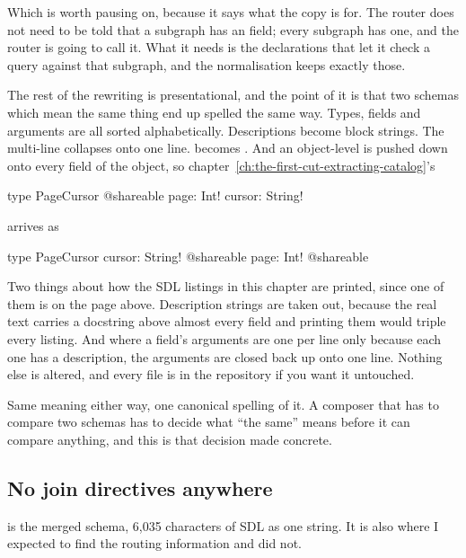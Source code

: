 %
Which is worth pausing on, because it says what the copy is for. The router does
not need to be told that a subgraph has an  field; every
subgraph has one, and the router is going to call it. What it needs is the
declarations that let it check a query against that subgraph, and the
normalisation keeps exactly those.

The rest of the rewriting is presentational, and the point of it is that two
schemas which mean the same thing end up spelled the same way. Types, fields and
arguments are all sorted alphabetically. Descriptions become block strings. The
multi-line  collapses onto one line. 
becomes . And an object-level  is
pushed down onto every field of the object, so
chapter~\ref{ch:the-first-cut-extracting-catalog}'s

\begin{graphqlsdl}
type PageCursor @shareable {
  page: Int!
  cursor: String!
}
\end{graphqlsdl}

arrives as

\begin{graphqlsdl}
type PageCursor {
  cursor: String! @shareable
  page: Int! @shareable
}
\end{graphqlsdl}

%
Two things about how the SDL listings in this chapter are printed, since one of
them is on the page above. Description strings are taken out, because the real
text carries a docstring above almost every field and printing them would triple
every listing. And where a field's arguments are one per line only because each
one has a description, the arguments are closed back up onto one line. Nothing
else is altered, and every file is in the repository if you want it untouched.

Same meaning either way, one canonical spelling of it. A composer that has to
compare two schemas has to decide what \enquote{the same} means before it can
compare anything, and this is that decision made concrete.

\subsection*{No join directives anywhere}

%
 is the merged schema, 6{,}035 characters of
SDL as one string. It is also where I expected to find the routing information
and did not.

